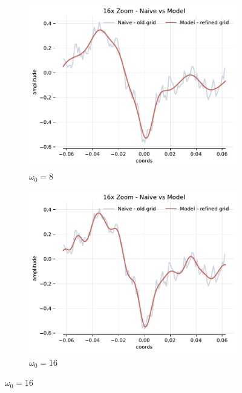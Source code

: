 \begin{figure}[h]
    \centering
    \begin{subfigure}[b]{0.32\textwidth}
        \centering
        \includegraphics[width=\textwidth]{img/ch4/16x-zoom-1hl-32hf-8hz.pdf}
        \caption{$\omega_0=8$}
        \label{fig:16x-zoom-1hl-32hf-8hz}
    \end{subfigure}
    \begin{subfigure}[b]{0.32\textwidth}
        \centering
        \includegraphics[width=\textwidth]{img/ch4/16x-zoom-1hl-32hf-16hz.pdf}
        \caption{$\omega_0=16$}
        \label{fig:16x-zoom-1hl-32hf-16hz}
    \end{subfigure}

\end{figure}
